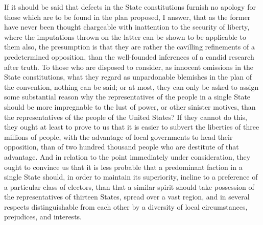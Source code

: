 If it should be said that defects in the State constitutions furnish no apology for those which are to be found in the plan proposed, I answer, that as the former have never been thought chargeable with inattention to the security of liberty, where the imputations thrown on the latter can be shown to be applicable to them also, the presumption is that they are rather the cavilling refinements of a predetermined opposition, than the well-founded inferences of a candid research after truth. 
To those who are disposed to consider, as innocent omissions in the State constitutions, what they regard as unpardonable blemishes in the plan of the convention, nothing can be said; or at most, they can only be asked to assign some substantial reason why the representatives of the people in a single State should be more impregnable to the lust of power, or other sinister motives, than the representatives of the people of the United States? 
If they cannot do this, they ought at least to prove to us that it is easier to subvert the liberties of three millions of people, with the advantage of local governments to head their opposition, than of two hundred thousand people who are destitute of that advantage. 
And in relation to the point immediately under consideration, they ought to convince us that it is less probable that a predominant faction in a single State should, in order to maintain its superiority, incline to a preference of a particular class of electors, than that a similar spirit should take possession of the representatives of thirteen States, spread over a vast region, and in several respects distinguishable from each other by a diversity of local circumstances, prejudices, and interests.

